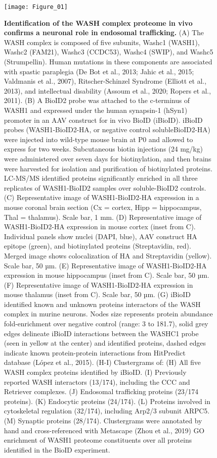 \begin{figure}
\begin{fullwidth}
\texttt{[image: Figure\_01]}
	\caption{ \textbf{Identification of the WASH complex proteome in vivo confirms a
	neuronal role in endosomal trafficking.}
	(A) The WASH complex is composed of five subunits, Washc1 (WASH1), Washc2
	(FAM21), Washc3 (CCDC53), Washc4 (SWIP), and Washc5 (Strumpellin). Human
	mutations in these components are associated with spastic paraplegia (De Bot et
	al., 2013; Jahic et al., 2015; Valdmanis et al., 2007), Ritscher-Schinzel
	Syndrome (Elliott et al., 2013), and intellectual disability (Assoum et al.,
	2020; Ropers et al., 2011). 
	(B) A BioID2 probe was attached to the c-terminus of WASH1 and expressed under
	the human synapsin-1 (hSyn1) promoter in an AAV construct for in vivo BioID
	(iBioID). iBioID probes (WASH1-BioID2-HA, or negative control solubleBioID2-HA)
	were injected into wild-type mouse brain at P0 and allowed to express for two
	weeks. Subcutaneous biotin injections (24 mg/kg) were administered over seven
	days for biotinylation, and then brains were harvested for isolation and
	purification of biotinylated proteins. LC-MS/MS identified proteins
	significantly enriched in all three replicates of WASH1-BioID2 samples over
	soluble-BioID2 controls. 
	(C) Representative image of WASH1-BioID2-HA expression in a mouse coronal brain
	section (Cx = cortex, Hipp = hippocampus, Thal = thalamus). Scale bar, 1 mm.
	(D) Representative image of WASH1-BioID2-HA expression in mouse cortex (inset
	from C). Individual panels show nuclei (DAPI, blue), AAV construct HA epitope
	(green), and biotinylated proteins (Streptavidin, red). Merged image shows
	colocalization of HA and Streptavidin (yellow). Scale bar, 50 µm. 
	(E) Representative image of WASH1-BioID2-HA expression in mouse hippocampus
	(inset from C). Scale bar, 50 µm.
	(F) Representative image of WASH1-BioID2-HA expression in mouse thalamus (inset
	from C). Scale bar, 50 µm.
	(G) iBioID identified known and unknown proteins interactors of the WASH complex
	in murine neurons. Nodes size represents protein abundance fold-enrichment over
	negative control (range: 3 to 181.7), solid grey edges delineate iBioID
	interactions between the WASHC1 probe (seen in yellow at the center) and
	identified proteins, dashed edges indicate known protein-protein interactions
	from HitPredict database (López et al., 2015). (H-I) Clustergrams of: 
	(H) All five WASH complex proteins identified by iBioID.
	(I) Previously reported WASH interactors (13/174), including the CCC and
	Retriever complexes.
	(J) Endosomal trafficking proteins (23/174 proteins).
	(K) Endocytic proteins (24/174).
	(L) Proteins involved in cytoskeletal regulation (32/174), including Arp2/3
	subunit ARPC5.
	(M) Synaptic proteins (28/174). Clustergrams were annotated by hand and
	cross-referenced with Metascape (Zhou et al., 2019) GO enrichment of WASH1
	proteome constituents over all proteins identified in the BioID experiment.
	}
\label{fig:Figure_01}
\end{fullwidth}
\end{figure}

